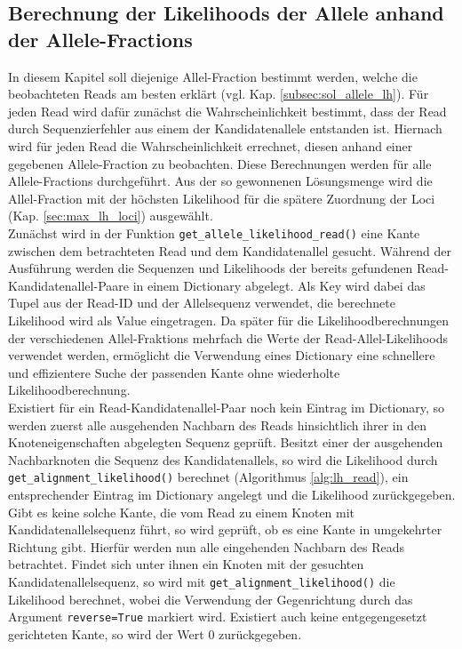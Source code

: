 \subsection{Berechnung der Likelihoods der Allele anhand der Allele-Fractions} \label{subsec:lh_allele}

In diesem Kapitel soll diejenige Allel-Fraction bestimmt werden, welche die beobachteten Reads am besten erklärt (vgl. Kap. \ref{subsec:sol_allele_lh}). Für jeden Read wird dafür zunächst die Wahrscheinlichkeit bestimmt, dass der Read durch Sequenzierfehler aus einem der Kandidatenallele entstanden ist. Hiernach wird für jeden Read die Wahrscheinlichkeit errechnet, diesen anhand einer gegebenen Allele-Fraction zu beobachten. Diese Berechnungen werden für alle Allele-Fractions durchgeführt. Aus der so gewonnenen Lösungsmenge wird die Allel-Fraction mit der höchsten Likelihood für die spätere Zuordnung der Loci (Kap. \ref{sec:max_lh_loci}) ausgewählt. \\ 

Zunächst wird in der Funktion \lstinline|get_allele_likelihood_read()| eine Kante zwischen dem betrachteten Read und dem Kandidatenallel gesucht. Während der Ausführung werden die Sequenzen und Likelihoods der bereits gefundenen Read-Kandidatenallel-Paare in einem Dictionary abgelegt. Als Key wird dabei das Tupel aus der Read-ID und der Allelsequenz verwendet, die berechnete Likelihood wird als Value eingetragen. Da später für die Likelihoodberechnungen der verschiedenen Allel-Fraktions mehrfach die Werte der Read-Allel-Likelihoods verwendet werden, ermöglicht die Verwendung eines Dictionary eine schnellere und effizientere Suche der passenden Kante ohne wiederholte Likelihoodberechnung. \\

Existiert für ein Read-Kandidatenallel-Paar noch kein Eintrag im Dictionary, so werden zuerst alle ausgehenden Nachbarn des Reads hinsichtlich ihrer in den Knoteneigenschaften abgelegten Sequenz geprüft. Besitzt einer der ausgehenden Nachbarknoten die Sequenz des Kandidatenallels, so wird die Likelihood durch \lstinline|get_alignment_likelihood()| berechnet (Algorithmus \ref{alg:lh_read}), ein entsprechender Eintrag im Dictionary angelegt und die Likelihood zurückgegeben.\\

Gibt es keine solche Kante, die vom Read zu einem Knoten mit Kandidatenallelsequenz führt, so wird geprüft, ob es eine Kante in umgekehrter Richtung gibt. Hierfür werden nun alle eingehenden Nachbarn des Reads betrachtet. Findet sich unter ihnen ein Knoten mit der gesuchten Kandidatenallelsequenz, so wird mit \lstinline|get_alignment_likelihood()| die Likelihood berechnet, wobei die Verwendung der Gegenrichtung durch das Argument \lstinline|reverse=True| markiert wird. Existiert auch keine entgegengesetzt gerichteten Kante, so wird der Wert $0$ zurückgegeben.\\

